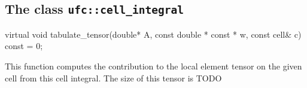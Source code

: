 










\subsection{The class \texttt{ufc::cell\_integral}}
\begin{code}
virtual void tabulate_tensor(double* A,
                             const double * const * w,
                             const cell& c) const = 0;
\end{code}
This function computes the contribution to the local element tensor
on the given cell from this cell integral.
The size of this tensor is TODO




